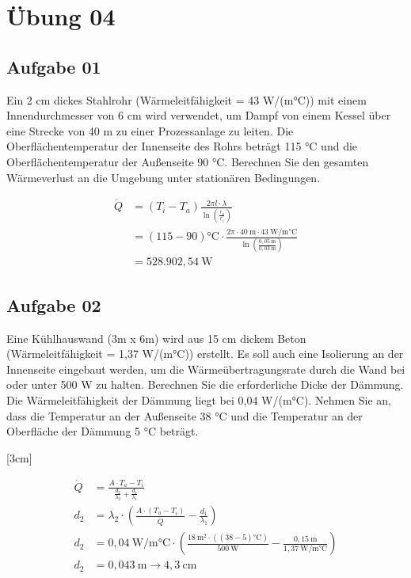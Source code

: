 \documentclass[a4paper,10pt]{article}
\begin{document}
\sidebar
{}
\par \vspace*{5mm}


\section*{Übung 04}
\subsection*{Aufgabe 01}
Ein 2 cm dickes Stahlrohr (Wärmeleitfähigkeit = 43 W/(m°C)) mit einem
Innendurchmesser von 6 cm wird verwendet, um Dampf von einem Kessel über eine
Strecke von 40 m zu einer Prozessanlage zu leiten. Die Oberflächentemperatur der
Innenseite des Rohrs beträgt 115 °C und die Oberflächentemperatur der Außenseite
90 °C. Berechnen Sie den gesamten Wärmeverlust an die Umgebung unter stationären
Bedingungen.

\begin{align*}
\dot{Q} &= (T_i - T_a) \frac{2 \pi l \cdot \lambda}{\ln(\frac{r_a}{r_i})} \\
		&= (115 - 90)\text{°C} \cdot \frac{2 \pi \cdot 40~\text{m} \cdot 43~ \text{W/m°C}}{\ln(\frac{0,05~\text{m}}{0,03~\text{m}})} \\
		&= 528.902,54~ \text{W}
\end{align*}


\subsection*{Aufgabe 02}
Eine Kühlhauswand (3m x 6m) wird aus 15 cm dickem Beton (Wärmeleitfähigkeit = 1,37
W/(m°C)) erstellt. Es soll auch eine Isolierung an der Innenseite eingebaut werden, um
die Wärmeübertragungsrate durch die Wand bei oder unter 500 W zu halten. Berechnen
Sie die erforderliche Dicke der Dämmung. Die Wärmeleitfähigkeit der Dämmung liegt bei
0,04 W/(m°C). Nehmen Sie an, dass die Temperatur an der Außenseite 38 °C und die
Temperatur an der Oberfläche der Dämmung 5 °C beträgt.


\reversemarginpar
{}[3cm]


\begin{align*}
\dot{Q} &= \frac{A \cdot T_a - T_i}{\frac{d_2}{\lambda_2} + \frac{d_1}{\lambda_1}} \\
	d_2 &= \lambda_2 \cdot (\frac{A \cdot (T_a - T_i)}{\dot{Q}} - \frac{d_1}{\lambda_1}) \\
	d_2 &= 0,04~ \text{W/m°C} \cdot (\frac{18~\text{m}^2 \cdot ((38-5) \text{°C})}{500~\text{W}} - \frac{0,15~\text{m}}{1,37~ \text{W/m°C} }) \\
	d_2 &= 0,043~\text{m} \rightarrow 4,3~ \text{cm}
\end{align*}
\end{document}

